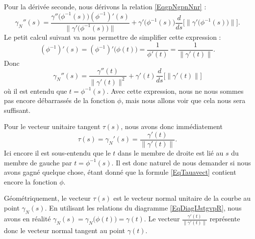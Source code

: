 Pour la dérivée seconde, nous dérivons la relation \eqref{EqgpNgpnNnr} :
\begin{equation}
    \gamma_N''(s)=\frac{ \gamma''\big( \phi^{-1}(s) \big)(\phi^{-1})'(s) }{ \| \gamma'\big( \phi^{-1}(s) \big) \| }+\gamma'\big( \phi^{-1}(s) \big)\frac{ d }{ ds }\Big[ \| \gamma'\big( \phi^{-1}(s) \big) \| \Big].
\end{equation}
Le petit calcul suivant va nous permettre de simplifier cette expression :
\begin{equation}        \label{Eavpemuetfpnorm}
    (\phi^{-1})'(s)=(\phi^{-1})'\big( \phi(t) \big)=\frac{1}{ \phi'(t) }=\frac{1}{ \| \gamma'(t) \| }.
\end{equation}
Donc
\begin{equation}
    \gamma_N''(s)=\frac{ \gamma''(t) }{ \| \gamma'(t) \|^2 }+\gamma'(t)\frac{ d }{ ds }\Big[ \| \gamma'(t) \| \Big]
\end{equation}
où il est entendu que $t=\phi^{-1}(s)$. Avec cette expression, nous ne nous sommes pas encore débarrassés de la fonction $\phi$, mais nous allons voir que cela nous sera suffisant.

Pour le vecteur unitaire tangent $\tau(s)$, nous avons donc immédiatement
\begin{equation}        \label{EqTauavect}
    \tau(s)=\gamma_N'(s)=\frac{ \gamma'(t) }{ \| \gamma'(t) \| }.
\end{equation}
Ici encore il est sous-entendu que le $t$ dans le membre de droite est lié au $s$ du membre de gauche par $t=\phi^{-1}(s)$. Il est donc naturel de nous demander si nous avons gagné quelque chose, étant donné que la formule \eqref{EqTauavect} contient encore la fonction $\phi$.

Géométriquement, le vecteur $\tau(s)$ est le vecteur normal unitaire de la courbe au point $\gamma_N(s)$. En utilisant les relations du diagramme \eqref{EqDiagIJstgvpR}, nous avons en réalité $\gamma_N(s)=\gamma_N\big( \phi(t) \big)=\gamma(t)$. Le vecteur $\frac{ \gamma'(t) }{ \| \gamma'(t) \| }$ représente donc le vecteur normal tangent au point $\gamma(t)$.


